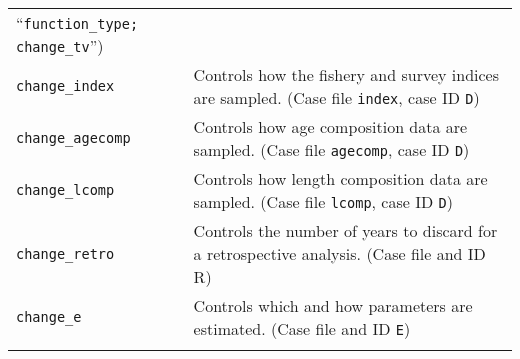 \documentclass[10pt]{article}
\begin{document}
\begin{longtable}[c]{@{}ll@{}}
\begin{minipage}[t]{0.57\columnwidth}
``\texttt{function\_type; change\_tv}'')
\end{minipage}
\\\noalign{\medskip}
\begin{minipage}[t]{0.32\columnwidth}\raggedright
\texttt{change\_index}
\end{minipage} & \begin{minipage}[t]{0.57\columnwidth}\raggedright
Controls how the fishery and survey indices are sampled. (Case file
\texttt{index}, case ID \texttt{D})
\end{minipage}
\\\noalign{\medskip}
\begin{minipage}[t]{0.32\columnwidth}\raggedright
\texttt{change\_agecomp}
\end{minipage} & \begin{minipage}[t]{0.57\columnwidth}\raggedright
Controls how age composition data are sampled. (Case file \texttt{agecomp},
case ID \texttt{D})
\end{minipage}
\\\noalign{\medskip}
\begin{minipage}[t]{0.32\columnwidth}\raggedright
\texttt{change\_lcomp}
\end{minipage} & \begin{minipage}[t]{0.57\columnwidth}\raggedright
Controls how length composition data are sampled. (Case file \texttt{lcomp},
case ID \texttt{D})
\end{minipage}
\\\noalign{\medskip}
\begin{minipage}[t]{0.32\columnwidth}\raggedright
\texttt{change\_retro}
\end{minipage} & \begin{minipage}[t]{0.57\columnwidth}\raggedright
Controls the number of years to discard for a retrospective analysis. (Case
file and ID \textsf{R})
\end{minipage}
\\\noalign{\medskip}
\begin{minipage}[t]{0.32\columnwidth}\raggedright
\texttt{change\_e}
\end{minipage} & \begin{minipage}[t]{0.57\columnwidth}\raggedright
Controls which and how parameters are estimated. (Case file and ID \texttt{E})
\end{minipage}
\\\noalign{\medskip}
\begin{minipage}[t]{0.32\columnwidth}\raggedright

\end{minipage}
\end{longtable}
\end{document}
